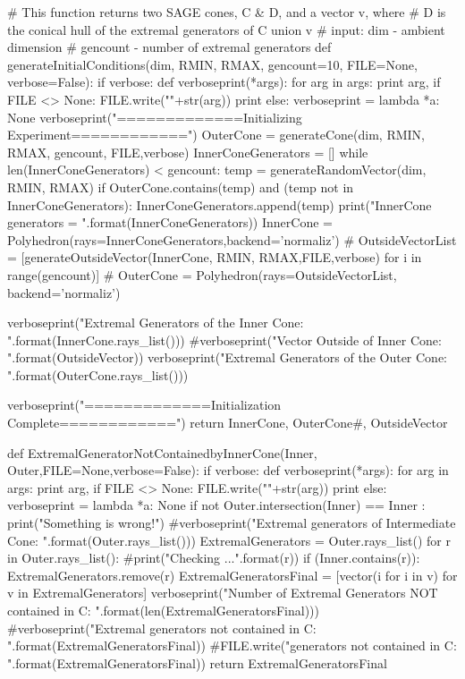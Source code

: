 \documentclass{TC}
\begin{document}
\begin{SAGE}
# This function returns two SAGE cones, C & D, and a vector v, where
# D is the conical hull of the extremal generators of C union v 
# input: dim - ambient dimension
#        gencount - number of extremal generators 
def generateInitialConditions(dim, RMIN, RMAX, gencount=10, FILE=None, verbose=False):
    if verbose:
        def verboseprint(*args):
            for arg in args:
                print arg,
                if FILE <> None:
                    FILE.write("\n"+str(arg))
            print
    else:
        verboseprint = lambda *a: None 
    verboseprint("\n=============Initializing Experiment============")
    OuterCone = generateCone(dim, RMIN, RMAX, gencount, FILE,verbose)
    InnerConeGenerators = []
    while len(InnerConeGenerators) < gencount:
        temp = generateRandomVector(dim, RMIN, RMAX)
        if OuterCone.contains(temp) and (temp not in InnerConeGenerators):
            InnerConeGenerators.append(temp)
            print("InnerCone generators = {}".format(InnerConeGenerators))
    InnerCone = Polyhedron(rays=InnerConeGenerators,backend='normaliz')
    #    OutsideVectorList = [generateOutsideVector(InnerCone, RMIN, RMAX,FILE,verbose) for i in range(gencount)]
    #    OuterCone = Polyhedron(rays=OutsideVectorList, backend='normaliz')
    


    verboseprint("Extremal Generators of the Inner Cone: \n{}".format(InnerCone.rays_list()))
    #verboseprint("Vector Outside of Inner Cone: {}".format(OutsideVector))
    verboseprint("Extremal Generators of the Outer Cone: \n{}".format(OuterCone.rays_list()))

    verboseprint("=============Initialization Complete============")
    return InnerCone, OuterCone#, OutsideVector


def ExtremalGeneratorNotContainedbyInnerCone(Inner, Outer,FILE=None,verbose=False):
    if verbose:
        def verboseprint(*args):
            for arg in args:
                print arg,
                if FILE <> None:
                    FILE.write("\n"+str(arg))
            print
    else:
        verboseprint = lambda *a: None 
    if not Outer.intersection(Inner) == Inner : 
        print("Something is wrong!")
    #verboseprint("Extremal generators of Intermediate Cone: \n{}".format(Outer.rays_list()))
    ExtremalGenerators = Outer.rays_list()
    for r in Outer.rays_list():
        #print("Checking {}...".format(r))
        if (Inner.contains(r)):
            ExtremalGenerators.remove(r)
    ExtremalGeneratorsFinal = [vector(i for i in v) for v in ExtremalGenerators]
    verboseprint("Number of Extremal Generators NOT contained in C: {}".format(len(ExtremalGeneratorsFinal)))
    #verboseprint("Extremal generators not contained in C: {}".format(ExtremalGeneratorsFinal))
    #FILE.write("\nExtremal generators not contained in C: {}".format(ExtremalGeneratorsFinal))
    return ExtremalGeneratorsFinal








\end{SAGE}
\end{document}
